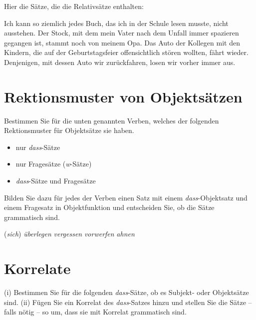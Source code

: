 \documentclass[12pt,a4paper,twoside]{article}
\newcommand{\Halbzeile}{\vspace{0.5\baselineskip}}
\newcommand{\Lf}{
  \setlength{\itemsep}{1pt}
  \setlength{\parskip}{0pt}
  \setlength{\parsep}{0pt}
}
\begin{document}
\Halbzeile

Hier die Sätze, die die Relativsätze enthalten:

\begin{exe}
\setcounter{xnumi}{0}
  \ex Ich kann so ziemlich jedes Buch, das ich in der Schule lesen musste, nicht ausstehen.
  \ex Der Stock, mit dem mein Vater nach dem Unfall immer spazieren gegangen ist, stammt noch von meinem Opa.
  \ex Das Auto der Kollegen mit den Kindern, die auf der Geburtstagsfeier offensichtlich stören wollten, fährt wieder.
  \ex Denjenigen, mit dessen Auto wir zurückfahren, losen wir vorher immer aus.
\end{exe}

\newpage

\section{Rektionsmuster von Objektsätzen}\label{sec:nebensaetze}

Bestimmen Sie für die unten genannten Verben, welches der folgenden Rektionsmuster für Objektsätze sie haben.

\begin{itemize}\Lf
  \item nur \textit{dass}-Sätze
  \item nur Fragesätze (\textit{w}-Sätze)
  \item \textit{dass}-Sätze und Fragesätze
\end{itemize}

Bilden Sie dazu für jedes der Verben einen Satz mit einem \textit{dass}-Objektsatz und einem Fragesatz in Objektfunktion und entscheiden Sie, ob die Sätze grammatisch sind.

\begin{exe}
\setcounter{xnumi}{0}
\ex (\textit{sich}) \textit{überlegen} %
  \ex \textit{vergessen} %
  \ex \textit{vorwerfen} %
  \ex \textit{ahnen} %
\end{exe}

\section{Korrelate}\label{sec:korrelate}

(i) Bestimmen Sie für die folgenden \textit{dass}-Sätze, ob es Subjekt- oder Objektsätze sind.
(ii) Fügen Sie ein Korrelat des \textit{dass}-Satzes hinzu und stellen Sie die Sätze -- falls nötig -- so um, dass sie mit Korrelat grammatisch sind.
\end{document}
